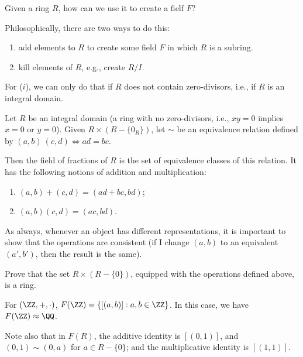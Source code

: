 
Given a ring $R$, how can we use it to create a fielf $F$?

Philosophically, there are two ways to do this:
\begin{enumerate}
	\item add elements to $R$ to create some field $F$ in which $R$ is a subring.
	\item kill elements of $R$, e.g., create $R/I$.
\end{enumerate}

\vspace{1em}

For ($i$), we can only do that if $R$ does not contain zero-divisors, i.e., if $R$ is an integral domain.

\begin{defn}
	Let $R$ be an integral domain (a ring with no zero-divisors, i.e., $xy = 0$ implies $x = 0$ or $y = 0$).
	Given $R \times (R - \{0_R\})$, let $\sim$ be an equivalence relation defined by $(a, b) ~ (c, d) \iff ad = bc$.

	Then the field of fractions of $R$ is the set of equivalence classes of this relation. It has the following notions of addition and multiplication:
	\begin{enumerate}
		\item $(a, b) + (c, d) = (ad + bc, bd)$;
		\item $(a, b) (c, d) = (ac, bd)$.
	\end{enumerate}

	As always, whenever an object has different representations, it is important to show that the operations are consistent (if I change $(a, b)$ to an equivalent $(a', b')$, then the result is the same).
\end{defn}

\begin{prob}
	Prove that the set $R \times (R - \{0\})$, equipped with the operations defined above, is a ring.
\end{prob}

\begin{exmp}
	For $(\ZZ, +, \cdot)$,  $F(\ZZ) = \{[(a, b)] : a, b \in \ZZ\}$. In this case, we have $F(\ZZ) \approx \QQ$.
\end{exmp}

Note also that in $F(R)$, the additive identity is $[(0, 1)]$, and  $(0, 1) \sim (0, a)$ for $a \in R - \{0\}$; and the multiplicative identity is $[(1, 1)]$.

